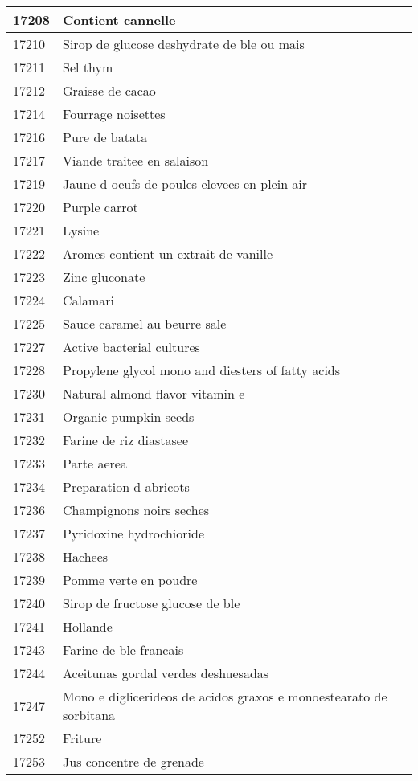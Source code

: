 \begin{longtable}{|l|l|}
17208 & Contient cannelle \\ \hline 
17210 & Sirop de glucose deshydrate de ble ou mais \\ \hline 
17211 & Sel thym \\ \hline 
17212 & Graisse de cacao \\ \hline 
17214 & Fourrage noisettes \\ \hline 
17216 & Pure de batata \\ \hline 
17217 & Viande traitee en salaison \\ \hline 
17219 & Jaune d oeufs de poules elevees en plein air \\ \hline 
17220 & Purple carrot \\ \hline 
17221 & Lysine \\ \hline 
17222 & Aromes contient un extrait de vanille \\ \hline 
17223 & Zinc gluconate \\ \hline 
17224 & Calamari \\ \hline 
17225 & Sauce caramel au beurre sale \\ \hline 
17227 & Active bacterial cultures \\ \hline 
17228 & Propylene glycol mono and diesters of fatty acids \\ \hline 
17230 & Natural almond flavor vitamin e \\ \hline 
17231 & Organic pumpkin seeds \\ \hline 
17232 & Farine de riz diastasee \\ \hline 
17233 & Parte aerea \\ \hline 
17234 & Preparation d abricots \\ \hline 
17236 & Champignons noirs seches \\ \hline 
17237 & Pyridoxine hydrochioride \\ \hline 
17238 & Hachees \\ \hline 
17239 & Pomme verte en poudre \\ \hline 
17240 & Sirop de fructose glucose de ble \\ \hline 
17241 & Hollande \\ \hline 
17243 & Farine de ble francais \\ \hline 
17244 & Aceitunas gordal verdes deshuesadas \\ \hline 
17247 & Mono e diglicerideos de acidos graxos e monoestearato de sorbitana \\ \hline 
17252 & Friture \\ \hline 
17253 & Jus concentre de grenade \\ \hline 

\end{longtable}

